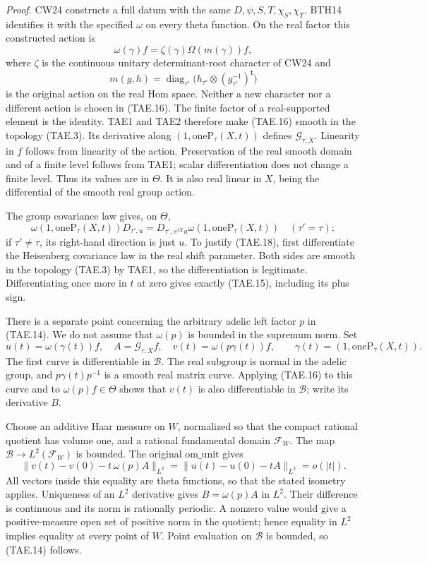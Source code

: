 \emph{Proof.}
CW24 constructs a full datum with the same
\(D,\psi,S,T,\chi_S,\chi_T\).  BTH14 identifies it with the
specified \(\omega\) on every theta function.  On the real
factor this constructed action is
\[
                  \omega(\gamma)f=\zeta(\gamma)\Omega(m(\gamma))f,
 \tag{TAE.16}
\]
where \(\zeta\) is the continuous unitary determinant-root
character of CW24 and
\[
 m(g,h)=\operatorname{diag}_{\tau'}
       \bigl(h_{\tau'}\otimes(g_{\tau'}^{-1})^{\mathsf t}\bigr)
 \tag{TAE.17}
\]
is the original action on the real Hom space.  Neither a new
character nor a different action is chosen in (TAE.16).
The finite factor of a real-supported element is the identity.
TAE1 and TAE2 therefore make (TAE.16) smooth in the topology
(TAE.3).  Its derivative along \((1,\mathrm{oneP}_\tau(X,t))\)
defines \(\mathcal G_{\tau,X}\).  Linearity in \(f\) follows from
linearity of the action.  Preservation of the real smooth
domain and of a finite level follows from TAE1; scalar
differentiation does not change a finite level.  Thus its
values are in \(\Theta\).  It is also real linear in \(X\),
being the differential of the smooth real group action.

The group covariance law gives, on \(\Theta\),
\[
 \omega(1,\mathrm{oneP}_\tau(X,t))D_{\tau',u}
 =D_{\tau',\,e^{tX}u}
       \omega(1,\mathrm{oneP}_\tau(X,t))
       \quad(\tau'=\tau);
 \tag{TAE.18}
\]
if \(\tau'\ne\tau\), its right-hand direction is just \(u\).
To justify (TAE.18), first differentiate the Heisenberg
covariance law in the real shift parameter.  Both sides are
smooth in the topology (TAE.3) by TAE1, so the differentiation
is legitimate.  Differentiating once more in \(t\) at zero
gives exactly (TAE.15), including its plus sign.

There is a separate point concerning the arbitrary adelic
left factor \(p\) in (TAE.14).  We do not assume that
\(\omega(p)\) is bounded in the supremum norm.
Set
\[
 u(t)=\omega(\gamma(t))f,\quad
 A=\mathcal G_{\tau,X}f,\quad
 v(t)=\omega(p\gamma(t))f,
 \qquad \gamma(t)=(1,\mathrm{oneP}_\tau(X,t)).
 \tag{TAE.19}
\]
The first curve is differentiable in \(\mathcal B\).
The real subgroup is normal in the adelic group, and
\(p\gamma(t)p^{-1}\) is a smooth real matrix curve.
Applying (TAE.16) to this curve and to \(\omega(p)f\in\Theta\)
shows that \(v(t)\) is also differentiable in \(\mathcal B\);
write its derivative \(B\).

Choose an additive Haar measure on \(W\), normalized so that
the compact rational quotient has volume one, and a rational
fundamental domain \(\mathcal F_W\).  The map
\(\mathcal B\to L^2(\mathcal F_W)\) is bounded.  The original
\(\mathrm{om\_unit}\) gives
\[
 \|v(t)-v(0)-t\,\omega(p)A\|_{L^2}
       =\|u(t)-u(0)-tA\|_{L^2}=o(|t|).
 \tag{TAE.20}
\]
All vectors inside this equality are theta functions, so that
the stated isometry applies.  Uniqueness of an \(L^2\)
derivative gives \(B=\omega(p)A\) in \(L^2\).
Their difference is continuous and its norm is rationally
periodic.  A nonzero value would give a positive-measure open
set of positive norm in the quotient; hence equality in
\(L^2\) implies equality at every point of \(W\).
Point evaluation on \(\mathcal B\) is bounded, so (TAE.14)
follows.

